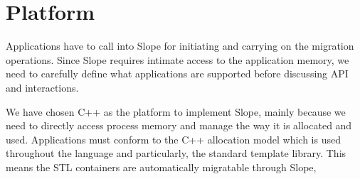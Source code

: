 \section{Platform}
Applications have to call into Slope for initiating and carrying on the
migration operations. Since Slope requires intimate access to the application
memory, we need to carefully define what applications are supported
before discussing API and interactions.

We have chosen C++ as the platform to implement Slope, mainly because we need
to directly access process memory and manage the way it is allocated and used.
Applications must conform to the C++ allocation model which is used throughout
the language and particularly, the standard template library. This means the
STL containers are automatically migratable through Slope, 

